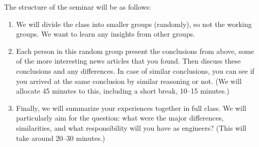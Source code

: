 The structure of the seminar will be as follows:
\begin{enumerate}
  \item We will divide the class into smaller groups (randomly), so not the 
    working groups.
    We want to learn any insights from other groups.

  \item Each person in this random group present the conclusions from above, 
    some of the more interesting news articles that you found.
    Then discuss these conclusions and any differences.
    In case of similar conclusions, you can see if you arrived at the same 
    conclusion by similar reasoning or not.
    (We will allocate 45 minutes to this, including a short break, 10--15 
    minutes.)

  \item Finally, we will summarize your experiences together in full class.
    We will particularly aim for the question: what were the major 
    differences, similarities, and what responsibility will you have as 
    engineers?
    (This will take around 20--30 minutes.)
\end{enumerate}




\begin{frame}[allowframebreaks]
  \printbibliography{}
\end{frame}
